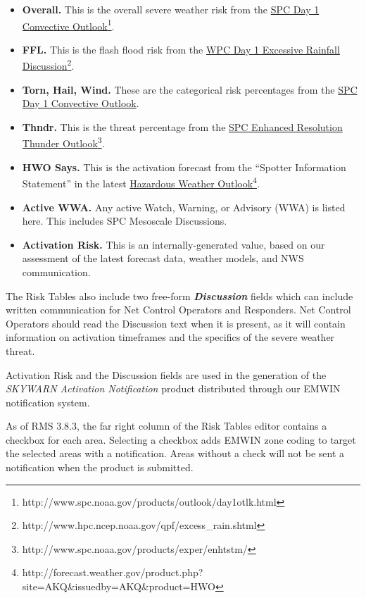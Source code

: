 \documentclass[pdflatex,letterpaper,twoside,12pt]{book}
\begin{document}
\begin{itemize}
\item \textbf{Overall.} This is the overall severe weather risk from the \href{http://www.spc.noaa.gov/products/outlook/day1otlk.html}{SPC Day 1 Convective Outlook}\footnote{http://www.spc.noaa.gov/products/outlook/day1otlk.html}.
\item \textbf{FFL.} This is the flash flood risk from the \href{http://www.hpc.ncep.noaa.gov/qpf/excess_rain.shtml}{WPC Day 1 Excessive Rainfall Discussion}\footnote{http://www.hpc.ncep.noaa.gov/qpf/excess\_rain.shtml}. 
\item \textbf{Torn, Hail, Wind.} These are the categorical risk percentages from the \href{http://www.spc.noaa.gov/products/outlook/day1otlk.html}{SPC Day 1 Convective Outlook}.
\item \textbf{Thndr.} This is the threat percentage from the \href{http://www.spc.noaa.gov/products/exper/enhtstm/}{SPC Enhanced Resolution Thunder Outlook}\footnote{http://www.spc.noaa.gov/products/exper/enhtstm/}.
\item \textbf{HWO Says.}  This is the activation forecast from the ``Spotter Information Statement'' in the latest \href{http://forecast.weather.gov/product.php?site=AKQ&issuedby=AKQ&product=HWO}{Hazardous Weather Outlook}\footnote{http://forecast.weather.gov/product.php?site=AKQ\&issuedby=AKQ\&product=HWO}.
\item \textbf{Active WWA.}  Any active Watch, Warning, or Advisory (WWA) is listed here.  This includes SPC Mesoscale Discussions.
\item \textbf{Activation Risk.}  This is an internally-generated value, based on our assessment of the latest forecast data, weather models, and NWS communication.
\end{itemize}

The Risk Tables also include two free-form \textbf{\emph{Discussion}} fields which can include written communication for Net Control Operators and Responders.  Net Control Operators should read the Discussion text when it is present, as it will contain information on activation timeframes and the specifics of the severe weather threat.

Activation Risk and the Discussion fields are used in the generation of the \emph{SKYWARN Activation Notification} product distributed through our EMWIN notification system.

As of RMS 3.8.3, the far right column of the Risk Tables editor contains a checkbox for each area.  Selecting a checkbox adds EMWIN zone coding to target the selected areas with a notification.  Areas without a check will not be sent a notification when the product is submitted.
\end{document}
